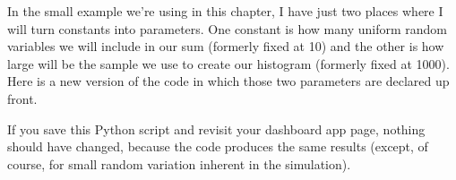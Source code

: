 \documentclass[letterpaper,10pt,english]{jupyterBook}
\begin{document}
\sphinxAtStartPar
In the small example we’re using in this chapter, I have just two places where I will turn constants into parameters.  One constant is how many uniform random variables we will include in our sum (formerly fixed at 10) and the other is how large will be the sample we use to create our histogram (formerly fixed at 1000).  Here is a new version of the code in which those two parameters are declared up front.

\begin{sphinxVerbatim}[commandchars=\\\{\}]
   
   

      
                    

  
       

   
  \PYG{p}{[}      \PYG{p}{]}
  

     
     
\end{sphinxVerbatim}

\sphinxAtStartPar
If you save this Python script and revisit your dashboard app page, nothing should have changed, because the code produces the same results (except, of course, for small random variation inherent in the simulation).
\end{document}
